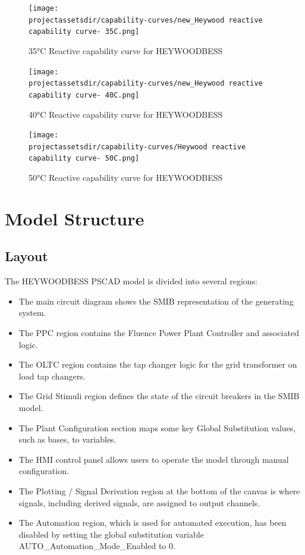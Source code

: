 \documentclass{../grid-link-report}
\newcommand{\projectassetsdir}{../project-assets}
\begin{document}
	
		\begin{figure}[H]
		\centering
		\texttt{[image: \\projectassetsdir/capability-curves/new\_Heywood reactive capability curve- 35C.png]}
		\caption{35°C Reactive capability curve for HEYWOODBESS}
		\label{fig:pq-curve-35degC}
	\end{figure}
	
	\begin{figure}[H]
		\centering
		\texttt{[image: \\projectassetsdir/capability-curves/new\_Heywood reactive capability curve- 40C.png]}
		\caption{40°C Reactive capability curve for HEYWOODBESS}
		\label{fig:pq-curve-40degC}
	\end{figure}
	
	\begin{figure}[H]
		\centering
		\texttt{[image: \\projectassetsdir/capability-curves/Heywood reactive capability curve- 50C.png]}
		\caption{50°C Reactive capability curve for HEYWOODBESS}
		\label{fig:pq-curve-50degC}
	\end{figure}
	
	\chapter{Model Structure}
		
	\section{Layout}
	
	The HEYWOODBESS PSCAD model is divided into several regions:
	\begin{itemize}
		\item The main circuit diagram shows the \ac{SMIB} representation of the generating system.
		\item The \ac{PPC} region contains the Fluence Power Plant Controller and associated logic.
		\item The \ac{OLTC} region contains the tap changer logic for the grid transformer on load tap changers.
		\item The Grid Stimuli region defines the state of the circuit breakers in the SMIB model.
		\item The Plant Configuration section maps some key Global Substitution values, such as bases, to variables.
		\item The HMI control panel allows users to operate the model through manual configuration.
		\item The Plotting / Signal Derivation region at the bottom of the canvas is where signals, including derived signals, are assigned to output channels.
		\item The Automation region, which is used for automated execution, has been disabled by setting the global substitution variable AUTO_Automation_Mode_Enabled to 0.
		
	\end{itemize}
	
\end{document}

